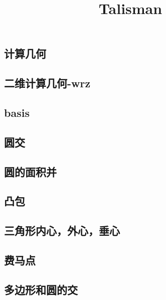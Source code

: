 \documentclass[titlepage,a4paper,10pt]{article}
\title{Talisman}
\begin{document}
	\maketitle
	\begin{multicols}{2}
		\setcounter{tocdepth}{3}
		\begingroup
		\let\cleardoublepage\relax
		\let\clearpage\relax
		\renewcommand{\contentsname}{目录}
		\tableofcontents
		\newpage
		\begin{spacing}{0.8}
		\footnotesize
		\section{计算几何}
			\subsection{二维计算几何-wrz}
				
			\subsection{basis}
				
			\subsection{圆交}
				
			\subsection{圆的面积并}
				
			\subsection{凸包}
				
			\subsection{三角形内心，外心，垂心}
				
			\subsection{费马点}
				
			\subsection{多边形和圆的交}
				

\end{spacing}
\end{multicols}
\end{document}
